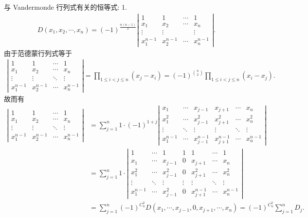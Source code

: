 与 Vandermonde 行列式有关的恒等式: 
1. \begin{align}
D\left(x_1, x_2, \cdots, x_n\right)=(-1)^{\frac{n(n-1)}{2}}
\left|\begin{array}{cccc}
1 & 1& \cdots & 1 \\
x_1&  x_2&\cdots& x_n \\
\vdots&\vdots& &\vdots \\
x_1^{n-1}& x_2^{n-1}& \cdots& x_n^{n-1}
\end{array}\right| .
\end{align}
由于范德蒙行列式等于
\begin{align*}
\left|\begin{array}{cccc}
1 & 1 & \cdots & 1 \\
x_1 & x_2 & \cdots & x_n \\
\vdots & \vdots & \ddots & \vdots \\
x_1^{n-1} & x_2^{n-1} & \cdots & x_n^{n-1}
\end{array}\right|=\prod_{1\leqslant i<j\leqslant n}\left(x_j-x_i\right)=(-1)^{\binom{n}{2}} \prod_{1\leqslant i<j\leqslant n}\left(x_i-x_j\right) .
\end{align*}
故而有
\begin{align*}
    \left|\begin{array}{cccc}
    1 & 1 & \cdots & 1 \\
    x_1 & x_2 & \cdots & x_n \\
    \vdots & \vdots & \ddots & \vdots \\
    x_1^{n-1} & x_2^{n-1} & \cdots & x_n^{n-1}
    \end{array}\right|
    &=\sum_{j=1}^n 1 \cdot(-1)^{1+j}\left|\begin{array}{cccccc}
    x_1 & \cdots & x_{j-1} & x_{j+1} & \cdots & x_n \\
    x_1^2 & \cdots & x_{j-1}^2 & x_{j+1}^2 & \cdots & x_n^2 \\
    \vdots & \ddots & \vdots & \vdots & \ddots & \vdots \\
    x_1^{n-1} & \cdots & x_{j-1}^{n-1} & x_{j+1}^{n-1} & \cdots & x_n^{n-1}
    \end{array}\right|\\
    &=\sum_{j=1}^n 1 \cdot \left| \begin{array}{cccccccc}
    1 & \cdots & 1 & 1 & 1 & \cdots & 1 \\
    x_1 & \cdots & x_{j-1} & 0 & x_{j+1} & \cdots & x_n \\
    x_1^2 & \cdots & x_{j-1}^2 & 0 & x_{j+1}^2 & \cdots & x_n^2 \\
    \vdots & \ddots & \vdots & \vdots & \vdots & \ddots & \vdots \\
    x_1^{n-1} & \cdots & x_{j-1}^2 & 0 & x_{j+1}^{n-1} & \cdots & x_n^{n-1}
    \end{array}\right| \\
    & =\sum_{j=1}^n(-1)^{C_n^2} D\left(x_1, \cdots, x_{j-1}, 0, x_{j+1}, \cdots, x_n\right)=(-1)^{C_n^2} \sum_{j=1}^n D_j .
    \end{align*}
\clearpage

